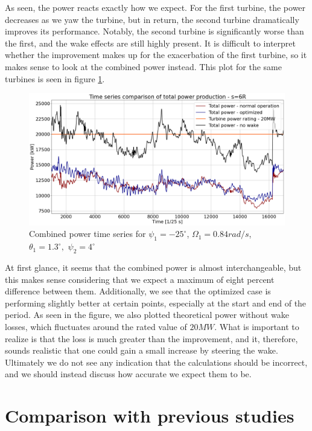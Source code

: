As seen, the power reacts exactly how we expect. For the first turbine, the power decreases as we yaw the turbine, but in return, the second turbine dramatically improves its performance. Notably, the second turbine is significantly worse than the first, and the wake effects are still highly present. It is difficult to interpret whether the improvement makes up for the exacerbation of the first turbine, so it makes sense to look at the combined power instead. This plot for the same turbines is seen in figure \ref{fig:powertimeseries_total}.


\begin{figure}[H]
    \centering
    \includegraphics[scale=0.26]{Illustrations/Timeseries_y1=-25_o1=85_p1=130_s6R_y2=4_total.png}
    \caption{Combined power time series for $\psi_1=-25^\circ$,  $\Omega_1=0.84 rad/s$, $\theta_1 = 1.3^\circ,$ $\psi_2 = 4^\circ$}
    \label{fig:powertimeseries_total}
\end{figure}

At first glance, it seems that the combined power is almost interchangeable, but this makes sense considering that we expect a maximum of eight percent difference between them. Additionally, we see that the optimized case is performing slightly better at certain points, especially at the start and end of the period. As seen in the figure, we also plotted theoretical power without wake losses, which fluctuates around the rated value of $20MW$. What is important to realize is that the loss is much greater than the improvement, and it, therefore, sounds realistic that one could gain a small increase by steering the wake. Ultimately we do not see any indication that the calculations should be incorrect, and we should instead discuss how accurate we expect them to be. 

\section{Comparison with previous studies}

